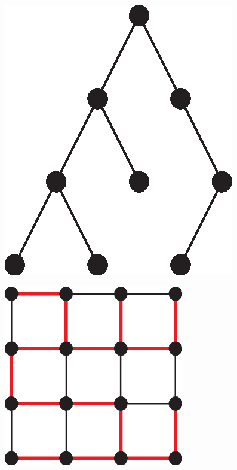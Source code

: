       \begin{figure}[H]
        \centering
        \begin{minipage}[b]{0.35\textwidth}
          \centering
          \includegraphics[width=\textwidth]{chapters/02_problem_definition/tree}
          \label{fig:tree}
        \end{minipage}
        \qquad
        \begin{minipage}[b]{0.55\textwidth}
          \centering
          \includegraphics[width=0.7\textwidth]{chapters/02_problem_definition/tree_spanning}
          \label{fig:tree_spanning}
        \end{minipage}
      \end{figure}
    
